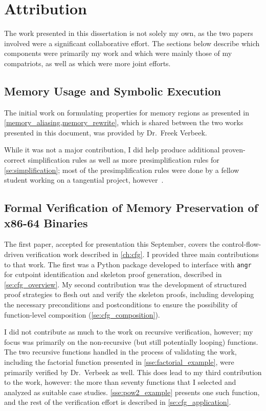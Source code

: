 \chapter{Attribution}\label{attribution}
The work presented in this dissertation is not solely my own,
as the two papers involved were a significant collaborative effort.
The sections below describe which components were primarily my work
and which were mainly those of my compatriots, as well as which were more joint efforts.

\section*{Memory Usage and Symbolic Execution}
The initial work on formulating properties for memory regions
as presented in \cref{memory_aliasing,memory_rewrite},
which is shared between the two works presented in this document,
was provided by Dr.~Freek Verbeek.

While it was not a major contribution,
I did help produce additional proven-correct simplification rules
as well as more presimplification rules for \cref{se:simplification};
most of the presimplification rules
were done by a fellow student working on a tangential project,
however~\citep{memocode2019}.

\section*{Formal Verification of Memory Preservation of x86-64 Binaries}\label{attribute1}
The first paper, accepted for presentation this September,
covers the control-flow-driven verification work described in \cref{ch:cfg}.
I provided three main contributions to that work.
The first was a Python package developed to interface with \texttt{angr}
for cutpoint identification and skeleton proof generation,
described in \cref{se:cfg_overview}.
My second contribution was the development of structured proof strategies
to flesh out and verify the skeleton proofs,
including developing the necessary preconditions and postconditions to ensure
the possibility of function-level composition (\cref{se:cfg_composition}).

I did not contribute as much to the work on recursive verification, however;
my focus was primarily on the non-recursive (but still potentially looping) functions.
The two recursive functions handled in the process of validating the work,
including the factorial function presented in \cref{sse:factorial_example},
were primarily verified by Dr.~Verbeek as well.
This does lead to my third contribution to the work, however:
the more than seventy functions that I selected and analyzed as suitable case studies.
\cref{sse:pow2_example} presents one such function,
and the rest of the verification effort is described in \cref{se:cfg_application}.

